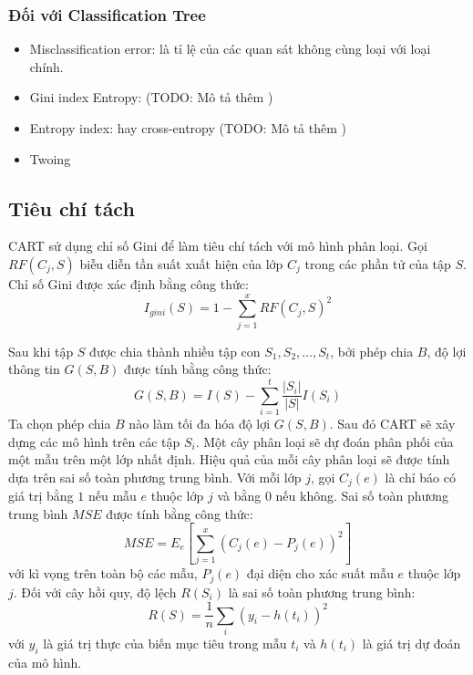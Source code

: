 \subsubsection{Đối với Classification Tree}
\begin{itemize}
\item Misclassification error: là tỉ lệ của các quan sát không cùng loại với loại chính. 
\item Gini index  Entropy: (TODO: Mô tả thêm )  
\item Entropy index: hay cross-entropy (TODO: Mô tả thêm )
\item Twoing
\end{itemize}


\subsection{Tiêu chí tách}
CART sử dụng chỉ số Gini để làm tiêu chí tách với mô hình phân loại. Gọi $RF(C_j,S)$ biễu diễn tần suất xuất hiện của lớp $C_j$ trong các phần tử của tập $S$. Chỉ số Gini được xác định bằng công thức:
$$I_{gini}(S)=1- \sum^x_{j=1}RF(C_j,S)^2$$

Sau khi tập $S$ được chia thành nhiều tập con $S_1,S_2,\ldots,S_t$, bởi phép chia $B$, độ lợi thông tin $G(S,B)$ được tính bằng công thức:
$$G(S,B) = I(S) - \sum^t_{i=1}\frac{|S_i|}{|S|}I(S_i)$$
Ta chọn phép chia $B$ nào làm tối đa hóa độ lợi $G(S,B)$.
Sau đó CART sẽ xây dựng các mô hình trên các tập $S_i$. Một cây phân loại sẽ dự đoán phân phối của một mẫu trên một lớp nhất định. Hiệu quả của mỗi cây phân loại sẽ được tính dựa trên sai số toàn phương trung bình. Với mỗi lớp $j$, gọi $C_j(e)$ là chỉ báo có giá trị bằng $1$ nếu mẫu $e$ thuộc lớp $j$ và bằng $0$ nếu không. Sai số toàn phương trung bình $MSE$ được tính bằng công thức:
$$MSE=E_e\left[\sum^x_{j=1}(C_j(e)-P_j(e))^2\right]$$
với kì vọng trên toàn bộ các mẫu, $P_j(e)$ đại diện cho xác suất mẫu $e$ thuộc lớp $j$. Đối với cây hồi quy, độ lệch  $R(S_i)$ là sai số toàn phương trung bình:
$$R(S) = \frac{1}{n}\sum_i(y_i - h(t_i))^2$$
với $y_i$ là giá trị thực của biến mục tiêu trong mẫu $t_i$ và $h(t_i)$ là giá trị dự đoán của mô hình.\\


